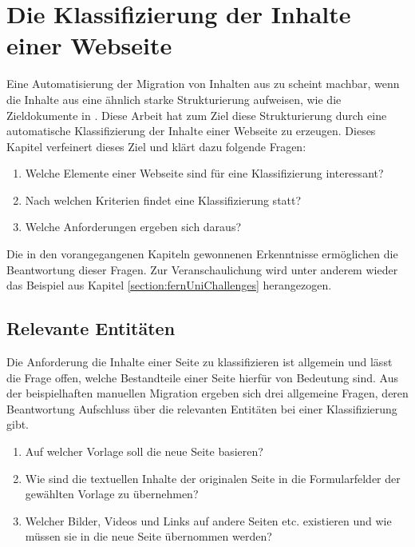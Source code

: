 \section{Die Klassifizierung der Inhalte einer Webseite}
    \label{section:WebpageClassification}
    Eine Automatisierung der Migration von Inhalten aus {\wordpress} zu {\imperia} scheint machbar,
    wenn die Inhalte aus {\wordpress} eine ähnlich starke Strukturierung aufweisen,
    wie die Zieldokumente in {\imperia}.
    Diese Arbeit hat zum Ziel diese Strukturierung
    durch eine automatische Klassifizierung der Inhalte einer Webseite zu erzeugen.
    Dieses Kapitel verfeinert dieses Ziel und klärt dazu folgende Fragen:

    \begin{enumerate}
        \item Welche Elemente einer Webseite sind für eine Klassifizierung interessant?
        \item Nach welchen Kriterien findet eine Klassifizierung statt?
        \item Welche Anforderungen ergeben sich daraus?
    \end{enumerate}

    Die in den vorangegangenen Kapiteln gewonnenen Erkenntnisse ermöglichen
    die Beantwortung dieser Fragen.
    Zur Veranschaulichung wird unter anderem wieder das Beispiel aus Kapitel
    \ref{section:fernUniChallenges} herangezogen.

    \subsection{Relevante Entitäten}
        \label{section:classificationEntities}
        Die Anforderung die Inhalte einer Seite zu klassifizieren
        ist allgemein und lässt die Frage offen,
        welche Bestandteile einer Seite hierfür von Bedeutung sind.
        Aus der beispielhaften manuellen Migration
        ergeben sich drei allgemeine Fragen,
        deren Beantwortung Aufschluss über die relevanten Entitäten
        bei einer Klassifizierung gibt.

        \begin{enumerate}
            \item   Auf welcher Vorlage soll die neue Seite basieren?
            \item   Wie sind die textuellen Inhalte der originalen Seite
                    in die Formularfelder der gewählten Vorlage zu übernehmen?
            \item   Welcher Bilder, Videos und Links auf andere Seiten etc. existieren
                    und wie müssen sie in die neue Seite übernommen werden?
        \end{enumerate}

